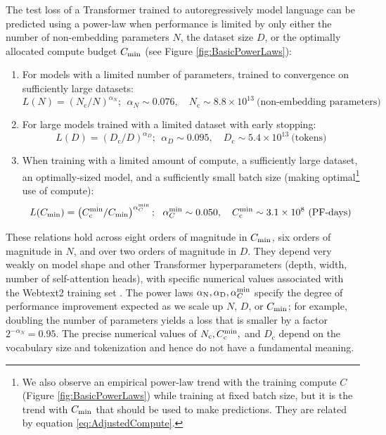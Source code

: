 \documentclass[english]{article}
\newcommand{\be}{\begin{equation}}
\newcommand{\ee}{\end{equation}}
\begin{document}
The test loss of a Transformer trained to autoregressively model language can be predicted using a power-law  when performance is limited by only either the number of non-embedding parameters $N$, the dataset size $D$, or the optimally allocated compute budget $C_{\rm min}$ (see Figure \ref{fig:BasicPowerLaws}):
\begin{enumerate}
\setlength\itemsep{0.5em}
\item For models with a limited number of parameters, trained to convergence on sufficiently large datasets:
\be L(N) = \left(N_{\mathrm{c}}/N\right)^{\alpha_N};~~ \alpha_N \sim 0.076, \quad N_{\mathrm{c}} \sim 8.8 \times 10^{13}~\text{(non-embedding parameters)} \label{eq:crit_n} \ee
\item For large models trained with a limited dataset with early stopping:
\be L(D) = \left(D_{\mathrm{c}}/D\right)^{\alpha_D};~~ \alpha_D \sim 0.095, \quad D_{\mathrm{c}} \sim 5.4 \times 10^{13}~\text{(tokens)} \label{eq:crit_d} \ee
\item When training with a limited amount of compute, a sufficiently large dataset, an optimally-sized model, and a sufficiently small batch size (making optimal\footnote{We also observe an empirical power-law trend with the training compute $C$ (Figure \ref{fig:BasicPowerLaws}) while training at fixed batch size, but it is the trend with $C_{\rm min}$ that should be used to make predictions.  They are related by equation \eqref{eq:AdjustedCompute}. } use of compute):
\be L(C_{\rm min}) = \left(C_{\mathrm{c}}^{\rm min} / C_{\rm min}\right)^{\alpha_C^{\rm min}};~~ \alpha_C^{\rm min} \sim 0.050, \quad C_{\mathrm{c}}^{\rm min} \sim 3.1 \times 10^{8}~\text{(PF-days)} \label{eq:crit_c} \ee
\end{enumerate}

These relations hold across eight orders of magnitude in $C_{\rm min}$, six orders of magnitude in $N$, and over two orders of magnitude in $D$.  They depend very weakly on model shape and other Transformer hyperparameters (depth, width, number of self-attention heads), with specific numerical values associated with the Webtext2 training set \cite{radford2019language}.   The power laws $\alpha_{\rm N}, \alpha_{\rm D}, \alpha_{C}^{\rm min}$ specify the degree of performance improvement expected as we scale up $N$, $D$, or $C_{\rm min}$; for example, doubling the number of parameters yields a loss that is smaller by a factor $2^{-\alpha_N}=0.95$. The precise numerical values of $N_{\mathrm{c}}, C_{\rm c}^{\rm min},$ and $D_{\mathrm{c}}$ depend on the vocabulary size and tokenization and hence do not have a fundamental meaning.  
\end{document}
